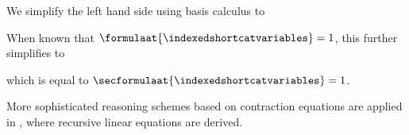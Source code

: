 \begin{example}
{        




    }

    We simplify the left hand side using basis calculus to

    When known that $\formulaat{\indexedshortcatvariables}=1$, this further simplifies to

    which is equal to $\secformulaat{\indexedshortcatvariables}=1$.
\end{example}

More sophisticated reasoning schemes based on contraction equations are applied in \cite{sato_linear_2017,tsilionis_tensor-based_2024}, where recursive linear equations are derived.